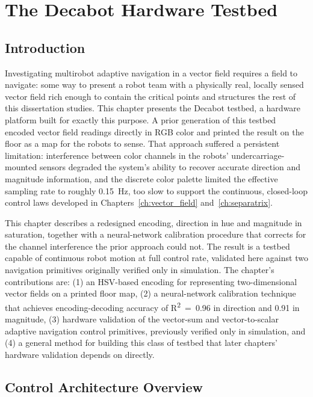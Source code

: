 \documentclass[12pt, letterpaper, oneside]{report}
\begin{document}
\chapter{The Decabot Hardware Testbed}
\label{ch:testbed}

\section{Introduction}

Investigating multirobot adaptive navigation in a vector field requires a
field to navigate: some way to present a robot team with a physically real,
locally sensed vector field rich enough to contain the critical points and
structures the rest of this dissertation studies. This chapter presents the
Decabot testbed, a hardware platform built for exactly this purpose. A prior
generation of this testbed encoded vector field readings directly in RGB
color and printed the result on the floor as a map for the robots to sense.
That approach suffered a persistent limitation: interference between color
channels in the robots' undercarriage-mounted sensors degraded the system's
ability to recover accurate direction and magnitude information, and the
discrete color palette limited the effective sampling rate to roughly
0.15~Hz, too slow to support the continuous, closed-loop control laws
developed in Chapters~\ref{ch:vector_field} and~\ref{ch:separatrix}.

This chapter describes a redesigned encoding, direction in hue and magnitude
in saturation, together with a neural-network calibration procedure that
corrects for the channel interference the prior approach could not. The
result is a testbed capable of continuous robot motion at full control rate,
validated here against two navigation primitives originally verified only in
simulation. The chapter's contributions are: (1) an HSV-based encoding for
representing two-dimensional vector fields on a printed floor map, (2) a
neural-network calibration technique that achieves encoding-decoding accuracy
of R\textsuperscript{2}~=~0.96 in direction and 0.91 in magnitude, (3)
hardware validation of the vector-sum and vector-to-scalar adaptive
navigation control primitives, previously verified only in simulation, and
(4) a general method for building this class of testbed that later chapters'
hardware validation depends on directly.

\section{Control Architecture Overview}
\label{sec:testbed_architecture}
\end{document}
